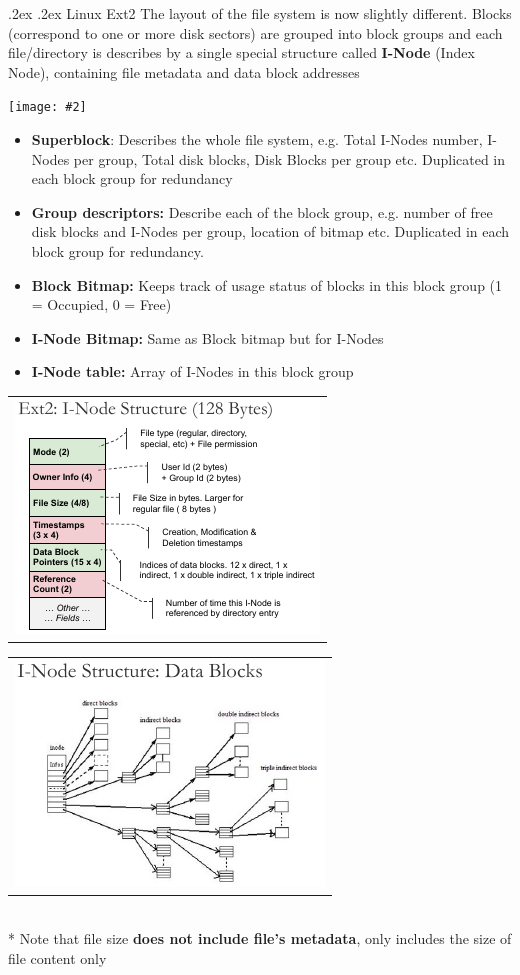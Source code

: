 \documentclass[13pt,landscape,a4paper]{article}
\makeatletter
\newcommand\ctrimg[2][0.8]{\begin{center}\texttt{[image: \#2]} \end{center}}
\renewcommand{\subsection}{\@startsection{subsection}{1}{0mm}%
    {.2ex}%
    {.2ex}%
    {\sffamily\bfseries}}
\makeatother
\begin{document}
\begin{multicols*}{3}
        \subsection{Linux Ext2}
        The layout of the file system is now slightly different. Blocks (correspond to one or more disk sectors) are grouped into block groups and each file/directory is describes by a single special structure called \textbf{I-Node} (Index Node), containing file metadata and data block addresses
        \ctrimg[0.7]{inode_fs}
        \begin{itemize}
            \item \textbf{Superblock}: Describes the whole file system, e.g. Total I-Nodes number, I-Nodes per group, Total disk blocks, Disk Blocks per group etc. Duplicated in each block group for redundancy
            \item \textbf{Group descriptors:} Describe each of the block group, e.g. number of free disk blocks and I-Nodes per group, location of bitmap etc. Duplicated in each block group for redundancy.
            \item \textbf{Block Bitmap:} Keeps track of usage status of blocks in this block group (1 = Occupied, 0 = Free)
            \item \textbf{I-Node Bitmap:} Same as Block bitmap but for I-Nodes
            \item \textbf{I-Node table:} Array of I-Nodes in this block group\\
        \end{itemize}
        \begin{tabular}{l}
            \includegraphics[width=0.44\linewidth]{inode_structure}
        \end{tabular}
        \begin{tabular}{l}
            \includegraphics[width=0.44\linewidth]{inode_data}
        \end{tabular}
        \\* Note that file size \textbf{does not include file's metadata}, only includes the size of file content only
        \columnbreak

\end{multicols*}
\end{document}
